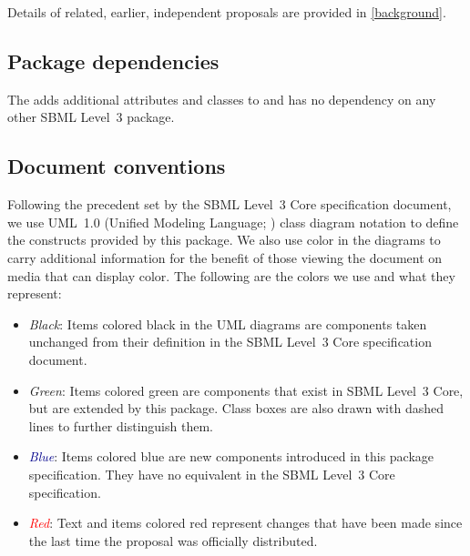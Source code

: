 Details of related, earlier, independent proposals are provided in \ref{background}.

\subsection{Package dependencies}

The \FBCPackage adds additional attributes and classes to \sbmlthreecore and has no dependency on any other SBML Level~3 package.


\subsection{Document conventions} \label{conventions}

Following the precedent set by the SBML Level~3 Core specification
document, we use UML~1.0 (Unified Modeling Language;
\citealt{eriksson:1998,oestereich:1999}) class diagram notation to
define the constructs provided by this package. We also use color in the
diagrams to carry additional information for the benefit of those
viewing the document on media that can display color. The following are
the colors we use and what they represent:

\begin{itemize}

\item[\raisebox{2.75pt}{\colorbox{black}{\rule{0.8pt}{0.8pt}}}]
\emph{Black}: Items colored black in the UML diagrams are components
taken unchanged from their definition in the SBML Level~3 Core
specification document.

\item[\raisebox{2.75pt}{\colorbox{mediumgreen}{\rule{0.8pt}{0.8pt}}}]
\emph{\textcolor{mediumgreen}{Green}}: Items colored green are
components that exist in SBML Level~3 Core, but are extended by this
package. Class boxes are also drawn with dashed lines to further
distinguish them.

\item[\raisebox{2.75pt}{\colorbox{darkblue}{\rule{0.8pt}{0.8pt}}}]
\emph{\textcolor{darkblue}{Blue}}: Items colored blue are new components
introduced in this package specification. They have no equivalent in the
SBML Level~3 Core specification.

\item[\raisebox{2.75pt}{\colorbox{red}{\rule{0.8pt}{0.8pt}}}]
\emph{\textcolor{red}{Red}}: Text and items colored red represent changes that have been made since the last time the proposal was officially distributed.


\end{itemize}

